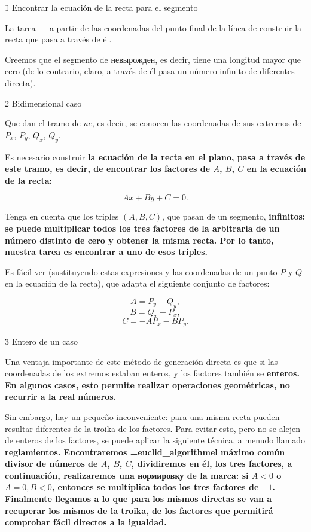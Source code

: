 \h1{ Encontrar la ecuación de la recta para el segmento }

La tarea --- a partir de las coordenadas del punto final de la línea de construir la recta que pasa a través de él.

Creemos que el segmento de невырожден, es decir, tiene una longitud mayor que cero (de lo contrario, claro, a través de él pasa un número infinito de diferentes directa).


\h2{ Bidimensional caso }

Que dan el tramo de $ue$, es decir, se conocen las coordenadas de sus extremos de $P_x$, $P_y$, $Q_x$, $Q_y$.

Es necesario construir \bf{la ecuación de la recta en el plano}, pasa a través de este tramo, es decir, de encontrar los factores de $A$, $B$, $C$ en la ecuación de la recta:

$$ A x + B y + C = 0. $$

Tenga en cuenta que los triples $(A,B,C)$, que pasan de un segmento, \bf{infinitos}: se puede multiplicar todos los tres factores de la arbitraria de un número distinto de cero y obtener la misma recta. Por lo tanto, nuestra tarea es encontrar a uno de esos triples.

Es fácil ver (sustituyendo estas expresiones y las coordenadas de un punto $P$ y $Q$ en la ecuación de la recta), que adapta el siguiente conjunto de factores:

$$ A = P_y - Q_y, $$
$$ B = Q_x - P_x, $$
$$ C = - A P_x - B P_y. $$


\h3{ Entero de un caso }

Una ventaja importante de este método de generación directa es que si las coordenadas de los extremos estaban enteros, y los factores también se \bf{enteros}. En algunos casos, esto permite realizar operaciones geométricas, no recurrir a la real números.

Sin embargo, hay un pequeño inconveniente: para una misma recta pueden resultar diferentes de la troika de los factores. Para evitar esto, pero no se alejen de enteros de los factores, se puede aplicar la siguiente técnica, a menudo llamado \bf{reglamientos}. Encontraremos \algohref=euclid_algorithm{el máximo común divisor} de números de $A$, $B$, $C$, dividiremos en él, los tres factores, a continuación, realizaremos una нормировку de la marca: si $A<0$ o $A=0, B<0$, entonces se multiplica todos los tres factores de $-1$. Finalmente llegamos a lo que para los mismos directas se van a recuperar los mismos de la troika, de los factores que permitirá comprobar fácil directos a la igualdad.


